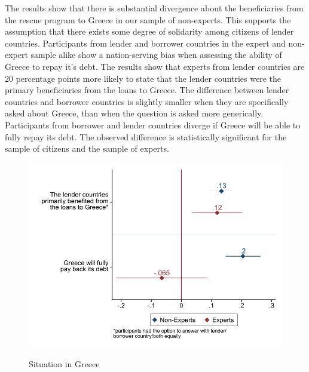 The results show that there is substantial divergence about the beneficiaries from the rescue program to Greece in our sample of non-experts. This supports the assumption that there exists some degree of solidarity among citizens of lender countries. 
Participants from lender and borrower countries in the expert and non-expert sample alike show a nation-serving bias when assessing the ability of Greece to repay it's debt. 
 \clearpage
 The results show that experts from  lender countries are 20 percentage points more likely to state that the lender countries were the primary beneficiaries from the loans to Greece. The difference between lender countries and borrower countries is slightly smaller when they are specifically asked about Greece, than when the question is asked more generically. Participants from borrower and lender countries diverge if Greece will be able to fully repay its debt. The observed difference is statistically significant for the sample of citizens and the sample of experts.  
 \\
\begin{figure}[h!] 
\begin{center}
     \caption{Situation in Greece}
     \includegraphics[scale=0.8]{Question6_7_base.pdf}
     \label{fig:my_label}
     \end{center}
     \tiny
\end{figure}
